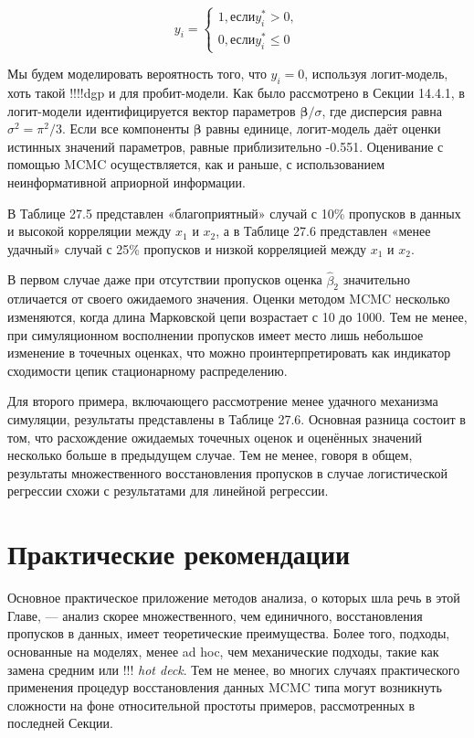 \begin{equation}
y_i=
\begin{cases}
1, \text{если} y_i^*>0, \\
0, \text{если} y_i^*\leqslant 0
\end{cases}
\end{equation}



Мы будем моделировать вероятность того, что $y_i=0$, используя логит-модель, хоть такой !!!!dgp и для пробит-модели. Как было рассмотрено в Секции 14.4.1, в логит-модели идентифицируется вектор параметров $\mathbf{\beta}/\sigma$, где дисперсия равна $\sigma^2=\pi^2/3$. Если все компоненты $\mathbf{\beta}$ равны единице, логит-модель даёт оценки истинных значений параметров, равные приблизительно -0.551. Оценивание с помощью MCMC осуществляется, как и раньше, с использованием неинформативной априорной информации.

В Таблице 27.5 представлен «благоприятный» случай с 10\% пропусков в данных и высокой корреляции между $x_1$ и $x_2$, а в Таблице 27.6 представлен «менее удачный» случай с 25\% пропусков и низкой корреляцией между $x_1$ и $x_2$.

В первом случае даже при отсутствии пропусков оценка $\widehat{\beta}_2$ значительно отличается от своего ожидаемого значения. Оценки методом MCMC несколько изменяются, когда длина Марковской цепи возрастает с 10 до 1000. Тем не менее, при симуляционном восполнении пропусков имеет место лишь небольшое изменение в точечных оценках, что можно проинтерпретировать как индикатор сходимости цепик стационарному распределению.

Для второго примера, включающего рассмотрение менее удачного механизма симуляции, результаты представлены в Таблице 27.6. Основная разница состоит в том, что расхождение ожидаемых точечных оценок и оценённых значений несколько больше в предыдущем случае. Тем не менее, говоря в общем, результаты множественного восстановления пропусков в случае логистической регрессии схожи с результатами для линейной регрессии.



\section{Практические рекомендации}

Основное практическое приложение методов анализа, о которых шла речь в этой Главе, --- анализ скорее множественного, чем единичного, восстановления пропусков в данных, имеет теоретические преимущества. Более того, подходы, основанные на моделях, менее ad hoc, чем механические подходы, такие как замена средним или !!! \emph{hot deck}. Тем не менее, во многих случаях практического применения процедур восстановления данных MCMC типа могут возникнуть сложности на фоне относительной простоты примеров, рассмотренных в последней Секции.

